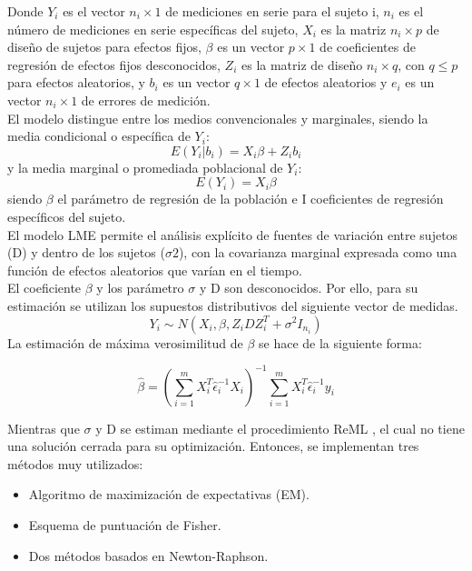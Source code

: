 	Donde $Y_{i}$ es el vector $n_{i}\times1$ de mediciones en serie para el sujeto i, $n_{i}$ es el número de mediciones en serie específicas del sujeto, $X_{i}$ es la matriz $n_{i}\times p$ de diseño de sujetos para efectos fijos, $\beta$ es un vector $p\times 1$ de coeficientes de regresión de efectos fijos desconocidos, $Z_{i}$ es la matriz de diseño $n_{i}\times q$, con $q\leq p$ para efectos aleatorios, y $b_{i}$ es un vector $q\times 1$ de efectos aleatorios y $e_{i}$ es un vector $n_{i}\times 1$ de errores de medición.\\
	
	El modelo distingue entre los medios convencionales y marginales, siendo la media condicional o específica de $Y_{i}$:\\
	\begin{equation}
		E(Y_{i}|b_{i}) = X_{i}\beta + Z_{i}b_{i}
	\end{equation}y la media marginal o promediada poblacional de $Y_{i}$:\\
	\begin{equation}
		E(Y_{i}) = X_{i} \beta
	\end{equation}
	siendo $\beta$ el parámetro de regresión de la población e I coeficientes de regresión específicos del sujeto.\\
	
	
	El modelo LME permite el análisis explícito de fuentes de variación entre sujetos (D) y dentro de los sujetos ($\sigma 2$), con la covarianza marginal expresada como una función de efectos aleatorios que varían en el tiempo.\\
	
	El coeficiente $\beta$ y los parámetro $\sigma $ y D son desconocidos. Por ello, para su estimación se utilizan los supuestos distributivos del siguiente vector de medidas. 
	\begin{equation}
		Y_{i}\sim N(X_{i},\beta,Z_{i}DZ_{i}^{T} + \sigma ^{2} I_{n_{i}})
	\end{equation}
	La estimación de máxima verosimilitud de $\beta$ se hace de la siguiente forma:
	
	\begin{equation}
		\hat{\beta}=(\sum_{i=1}^{m}X_{i}^{T} \hat{\epsilon}_{i}^{-1}X_{i})^{-1} \sum_{i=1}^{m} X_{i}^{T} \hat{\epsilon}_{i}^{-1}y_{i}
	\end{equation}
	
	Mientras que $\sigma $ y D se estiman mediante el procedimiento ReML \cite{verbeke1997linear}, el cual no tiene una solución cerrada para su optimización. Entonces, se implementan tres métodos muy utilizados: 
	\begin{itemize}
		\item Algoritmo de maximización de expectativas (EM).
		\item Esquema de puntuación de Fisher.
		\item Dos métodos basados en Newton-Raphson.
		
	\end{itemize}
	
